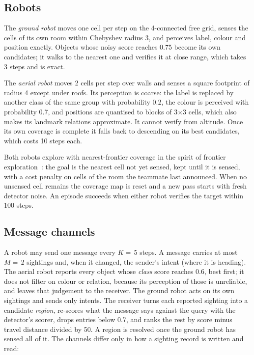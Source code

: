 \subsection{Robots}
The \emph{ground robot} moves one cell per step on the 4-connected free grid, senses the cells of its own room within Chebyshev radius 3, and perceives label, colour and position exactly. Objects whose noisy score reaches 0.75 become its own candidates; it walks to the nearest one and verifies it at close range, which takes 3 steps and is exact.

The \emph{aerial robot} moves 2 cells per step over walls and senses a square footprint of radius 4 except under roofs. Its perception is coarse: the label is replaced by another class of the same group with probability 0.2, the colour is perceived with probability 0.7, and positions are quantised to blocks of 3$\times$3 cells, which also makes its landmark relations approximate. It cannot verify from altitude. Once its own coverage is complete it falls back to descending on its best candidates, which costs 10 steps each.

Both robots explore with nearest-frontier coverage in the spirit of frontier exploration~\cite{xu2022explore}: the goal is the nearest cell not yet sensed, kept until it is sensed, with a cost penalty on cells of the room the teammate last announced. When no unsensed cell remains the coverage map is reset and a new pass starts with fresh detector noise. An episode succeeds when either robot verifies the target within 100 steps.

\subsection{Message channels}
A robot may send one message every $K=\,$5 steps. A message carries at most $M=\,$2 sightings and, when it changed, the sender's intent (where it is heading). The aerial robot reports every object whose \emph{class} score reaches 0.6, best first; it does not filter on colour or relation, because its perception of those is unreliable, and leaves that judgement to the receiver. The ground robot acts on its own sightings and sends only intents. The receiver turns each reported sighting into a candidate \emph{region}, re-scores what the message says against the query with the detector's scorer, drops entries below 0.7, and ranks the rest by score minus travel distance divided by 50. A region is resolved once the ground robot has sensed all of it. The channels differ only in how a sighting record is written and read:

